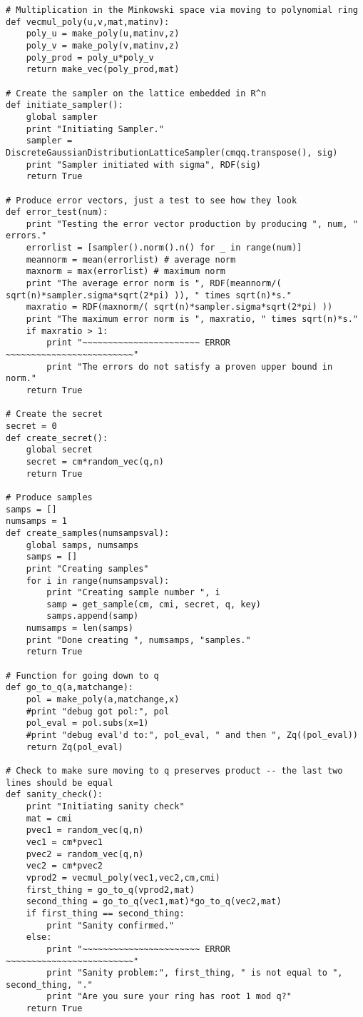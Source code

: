 \documentclass{llncs}
\newcommand{\<}{\langle}
\renewcommand{\>}{\rangle}
\begin{document}
\begin{verbatim}
# Multiplication in the Minkowski space via moving to polynomial ring
def vecmul_poly(u,v,mat,matinv):
    poly_u = make_poly(u,matinv,z)
    poly_v = make_poly(v,matinv,z)
    poly_prod = poly_u*poly_v
    return make_vec(poly_prod,mat)

# Create the sampler on the lattice embedded in R^n
def initiate_sampler():
    global sampler
    print "Initiating Sampler."
    sampler = DiscreteGaussianDistributionLatticeSampler(cmqq.transpose(), sig)
    print "Sampler initiated with sigma", RDF(sig)
    return True

# Produce error vectors, just a test to see how they look
def error_test(num):
    print "Testing the error vector production by producing ", num, " errors."
    errorlist = [sampler().norm().n() for _ in range(num)]
    meannorm = mean(errorlist) # average norm
    maxnorm = max(errorlist) # maximum norm
    print "The average error norm is ", RDF(meannorm/( sqrt(n)*sampler.sigma*sqrt(2*pi) )), " times sqrt(n)*s."
    maxratio = RDF(maxnorm/( sqrt(n)*sampler.sigma*sqrt(2*pi) ))
    print "The maximum error norm is ", maxratio, " times sqrt(n)*s."
    if maxratio > 1:
        print "~~~~~~~~~~~~~~~~~~~~~~~ ERROR ~~~~~~~~~~~~~~~~~~~~~~~~~"
        print "The errors do not satisfy a proven upper bound in norm."
    return True

# Create the secret
secret = 0
def create_secret():
    global secret
    secret = cm*random_vec(q,n)
    return True

# Produce samples
samps = []
numsamps = 1
def create_samples(numsampsval):
    global samps, numsamps
    samps = []
    print "Creating samples"
    for i in range(numsampsval):
        print "Creating sample number ", i
        samp = get_sample(cm, cmi, secret, q, key)
        samps.append(samp)
    numsamps = len(samps)
    print "Done creating ", numsamps, "samples."
    return True

# Function for going down to q
def go_to_q(a,matchange):
    pol = make_poly(a,matchange,x)
    #print "debug got pol:", pol
    pol_eval = pol.subs(x=1)
    #print "debug eval'd to:", pol_eval, " and then ", Zq((pol_eval))
    return Zq(pol_eval)

# Check to make sure moving to q preserves product -- the last two lines should be equal
def sanity_check():
    print "Initiating sanity check"
    mat = cmi
    pvec1 = random_vec(q,n)
    vec1 = cm*pvec1
    pvec2 = random_vec(q,n)
    vec2 = cm*pvec2
    vprod2 = vecmul_poly(vec1,vec2,cm,cmi)
    first_thing = go_to_q(vprod2,mat)
    second_thing = go_to_q(vec1,mat)*go_to_q(vec2,mat)
    if first_thing == second_thing:
        print "Sanity confirmed."
    else:
        print "~~~~~~~~~~~~~~~~~~~~~~~ ERROR ~~~~~~~~~~~~~~~~~~~~~~~~~"
        print "Sanity problem:", first_thing, " is not equal to ", second_thing, "."
        print "Are you sure your ring has root 1 mod q?"
    return True


\end{verbatim}
\end{document}
